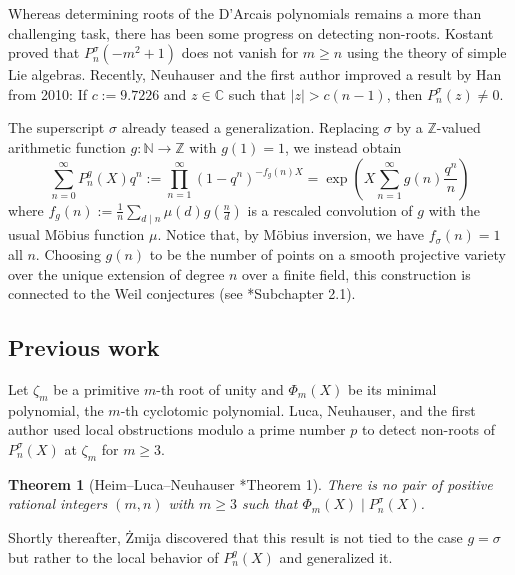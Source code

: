 \documentclass[a4paper, 11pt, reqno]{amsart}
\theoremstyle{plain}
\newtheorem{thm}{Theorem}[section]
\theoremstyle{definition}
\theoremstyle{remark}
\numberwithin{equation}{section}
\newcommand{\C}{\mathbb{C}}
\newcommand{\Z}{\mathbb{Z}}
\newcommand{\N}{\mathbb{N}}
\begin{document}
Whereas determining roots of the D'Arcais polynomials remains a more than challenging task, there has been some progress on detecting non-roots. Kostant \cite{Kostant} proved that $P_n^\sigma(-m^2+1)$ does not vanish for $m \geq n$ using the theory of simple Lie algebras. Recently, Neuhauser and the first author \cite{HeimNeu24} improved a result by Han \cite{Han10} from 2010: If $c := 9.7226$ and $z \in \C$ such that $|z| > c(n-1)$, then $P_n^\sigma(z) \neq 0$.

The superscript $\sigma$ already teased a generalization. Replacing $\sigma$ by a $\Z$-valued arithmetic function $g: \N \longrightarrow \Z$ with $g(1) = 1$, we instead obtain
\[\sum_{n = 0}^\infty P_n^g(X)q^n := \prod_{n = 1}^\infty (1 - q^n)^{-f_g(n)X} = \exp \left(X \sum_{n = 1}^\infty g(n) \frac{q^n}{n}\right)\]
where $f_g(n) := \frac{1}{n} \sum_{d \mid n}\mu(d)g\left(\frac{n}{d}\right)$ is a rescaled convolution of $g$ with the usual M\"obius function $\mu$. Notice that, by M\"obius inversion, we have $f_\sigma(n) = 1$ all $n$. Choosing $g(n)$ to be the number of points on a smooth projective variety over the unique extension of degree $n$ over a finite field, this construction is connected to the Weil conjectures (see \cite{Murty}*{Subchapter 2.1}).

\subsection{Previous work} Let $\zeta_m$ be a primitive $m$-th root of unity and $\Phi_m(X)$ be its minimal polynomial, the $m$-th cyclotomic polynomial. Luca, Neuhauser, and the first author used local obstructions modulo a prime number $p$ to detect non-roots of $P_n^\sigma(X)$ at $\zeta_m$ for $m \geq 3$.

\begin{thm}[Heim--Luca--Neuhauser \cite{HeimLucaNeu}*{Theorem 1}]
    There is no pair of positive rational integers $(m,n)$ with $m \geq 3$ such that $\Phi_m(X) \mid P_n^\sigma(X)$.
\end{thm}

Shortly thereafter, \.{Z}mija discovered that this result is not tied to the case $g = \sigma$ but rather to the local behavior of $P_n^g(X)$ and generalized it.
\end{document}
